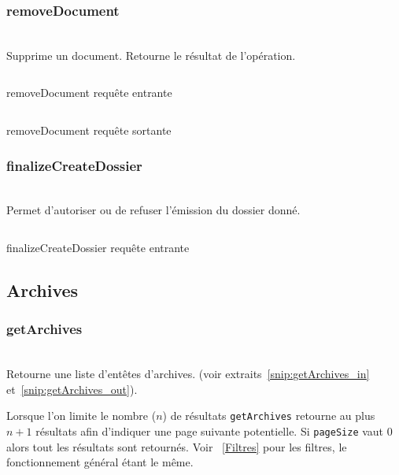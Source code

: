 \subsubsection{removeDocument}
\\

Supprime un document. Retourne le résultat de l'opération.

\begin{codesnippet}
\inputminted[frame=single,linenos,fontsize=\footnotesize]{javascript}{extraits/removeDocument_in.js}
\caption{removeDocument requête entrante}
\label{snip:removeDocument_in}
\end{codesnippet}

\begin{codesnippet}
\inputminted[frame=single,linenos,fontsize=\footnotesize]{javascript}{extraits/removeDocument_out.js}
\caption{removeDocument requête sortante}
\label{snip:removeDocument_out}
\end{codesnippet}


\subsubsection{finalizeCreateDossier}
\\

Permet d'autoriser ou de refuser l'émission du dossier donné.

\begin{codesnippet}
\inputminted[frame=single,linenos,fontsize=\footnotesize]{javascript}{extraits/finalizeCreateDossier_in.js}
\caption{finalizeCreateDossier requête entrante}
\label{snip:finalizeCreateDossier_in}
\end{codesnippet}

\subsection{Archives}

\subsubsection{getArchives}
\\

Retourne une liste d'entêtes d'archives. (voir extraits~\ref{snip:getArchives_in} et~\ref{snip:getArchives_out}).

Lorsque l'on limite le nombre ($n$) de résultats \verb|getArchives| retourne au plus $n + 1$ résultats afin d'indiquer une page suivante potentielle. Si \verb|pageSize| vaut 0 alors tout les résultats sont retournés. Voir ~\ref{Filtres} pour les filtres, le fonctionnement général étant le même.

